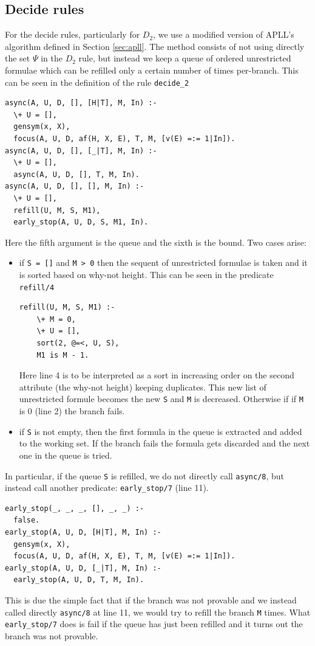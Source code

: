 \documentclass[a4paper, 12pt, tesi, english]{report}
\begin{document}
\subsection{Decide rules}\label{sec:decide}
For the decide rules, particularly for $D_2$, we use a modified version of APLL's algorithm defined in Section \ref{sec:apll}.
The method consists of not using directly the set $\Psi$ in the $D_2$ rule, but instead we keep a queue of ordered unrestricted formulae which can be refilled only a certain number of times per-branch.
This can be seen in the definition of the rule \texttt{decide\_2}
\begin{verbatim}
async(A, U, D, [], [H|T], M, In) :-
  \+ U = [],
  gensym(x, X),
  focus(A, U, D, af(H, X, E), T, M, [v(E) =:= 1|In]).
async(A, U, D, [], [_|T], M, In) :-
  \+ U = [],
  async(A, U, D, [], T, M, In).
async(A, U, D, [], [], M, In) :-
  \+ U = [],
  refill(U, M, S, M1),
  early_stop(A, U, D, S, M1, In).
\end{verbatim}
Here the fifth argument is the queue and the sixth is the bound.
Two cases arise:
\begin{itemize}
	\item if \texttt{S = []} and \texttt{M > 0} then the sequent of unrestricted formulae is taken and it is sorted based on why-not height.	%
		This can be seen in the predicate \texttt{refill/4}
		\begin{verbatim}
refill(U, M, S, M1) :-
	\+ M = 0,
	\+ U = [], 
	sort(2, @=<, U, S), 
	M1 is M - 1.
		\end{verbatim}
		Here line 4 is to be interpreted as a sort in increasing order on the second attribute (the why-not height) keeping duplicates.
		This new list of unrestricted formule becomes the new \texttt{S} and \texttt{M} is decreased.
		Otherwise if if \texttt{M} is 0 (line 2) the branch fails.
	\item if \texttt{S} is not empty, then the first formula in the queue is extracted and added to the working set.	%
		If the branch fails the formula gets discarded and the next one in the queue is tried.	%
\end{itemize}
In particular, if the queue \texttt{S} is refilled, we do not directly call \texttt{async/8}, but instead call another predicate: \texttt{early\_stop/7} (line 11).
\begin{verbatim}
early_stop(_, _, _, [], _, _) :-
  false.
early_stop(A, U, D, [H|T], M, In) :-
  gensym(x, X),
  focus(A, U, D, af(H, X, E), T, M, [v(E) =:= 1|In]).
early_stop(A, U, D, [_|T], M, In) :-
  early_stop(A, U, D, T, M, In).
\end{verbatim}
This is due the simple fact that if the branch was not provable and we instead called directly \texttt{async/8} at line 11, we would try to refill the branch \texttt{M} times.
What \texttt{early\_stop/7} does is fail if the queue has just been refilled and it turns out the branch was not provable.
\end{document}
